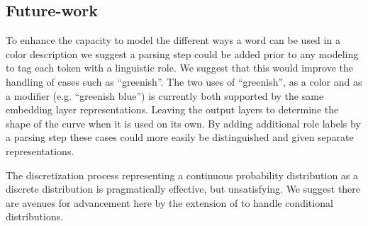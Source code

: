 \documentclass[11pt,letterpaper]{article}
\newcommand{\textcite}{\newcite}
\begin{document}
\subsection{Future-work}
To enhance the capacity to model the different ways a word can be used in a color description we suggest a parsing step could be added prior to any modeling to tag each token with a linguistic role.
We suggest that this would improve the handling of cases such as ``greenish''.
The two uses of ``greenish'', as a color and as a modifier (e.g. ``greenish blue'') is currently both supported by the same embedding layer representations.
Leaving the output layers to determine the shape of the curve when it is used on its own.
By adding additional role labels by a parsing step these cases could more easily be distinguished and given separate representations.


The discretization process representing a continuous probability distribution as a discrete distribution is pragmatically effective, but unsatisfying.
We suggest there are avenues for advancement here by the extension of \textcite{magdon1998neural} to handle conditional distributions.


\clearpage



\end{document}
